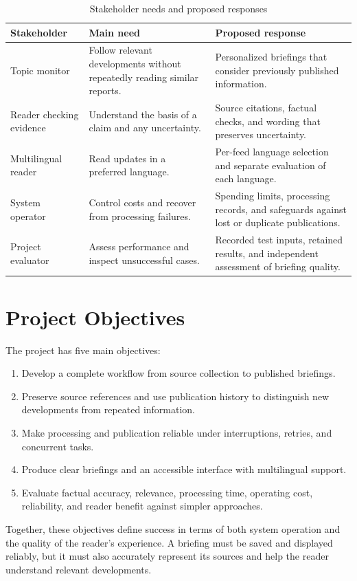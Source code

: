 \begin{table}[htbp]
\centering
\small
\caption{Stakeholder needs and proposed responses}
\label{tab:needs}
\begin{tabularx}{\linewidth}{p{2.8cm}XX}
\toprule
Stakeholder & Main need & Proposed response \\
\midrule
Topic monitor
& Follow relevant developments without repeatedly reading similar reports.
& Personalized briefings that consider previously published information. \\

Reader checking evidence
& Understand the basis of a claim and any uncertainty.
& Source citations, factual checks, and wording that preserves uncertainty. \\

Multilingual reader
& Read updates in a preferred language.
& Per-feed language selection and separate evaluation of each language. \\

System operator
& Control costs and recover from processing failures.
& Spending limits, processing records, and safeguards against lost or duplicate publications. \\

Project evaluator
& Assess performance and inspect unsuccessful cases.
& Recorded test inputs, retained results, and independent assessment of briefing quality. \\
\bottomrule
\end{tabularx}
\end{table}

\section{Project Objectives}

The project has five main objectives:

\begin{enumerate}
    \item Develop a complete workflow from source collection to published briefings.
    \item Preserve source references and use publication history to distinguish new developments from repeated information.
    \item Make processing and publication reliable under interruptions, retries, and concurrent tasks.
    \item Produce clear briefings and an accessible interface with multilingual support.
    \item Evaluate factual accuracy, relevance, processing time, operating cost, reliability, and reader benefit against simpler approaches.
\end{enumerate}

Together, these objectives define success in terms of both system operation and the quality of the reader's experience. A briefing must be saved and displayed reliably, but it must also accurately represent its sources and help the reader understand relevant developments.